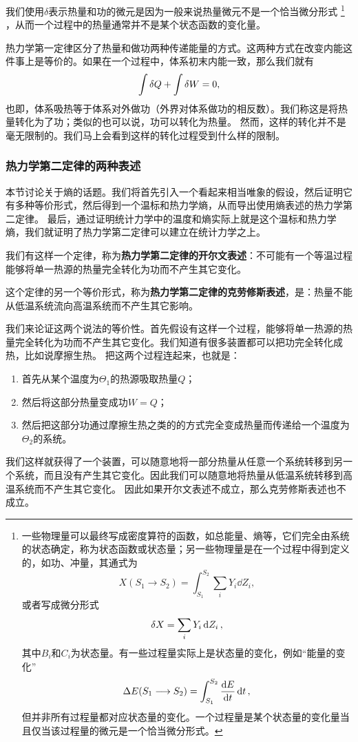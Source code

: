 \documentclass[hyperref, UTF8, a4paper]{ctexart}
\begin{document}
我们使用$\delta$表示热量和功的微元是因为一般来说热量微元不是一个恰当微分形式%
\footnote{一些物理量可以最终写成密度算符的函数，如总能量、熵等，它们完全由系统的状态确定，称为状态函数或状态量；另一些物理量是在一个过程中得到定义的，如功、冲量，其通式为
\[
    X(S_1 \longrightarrow S_2) = \int_{S_1}^{S_2} \sum_i Y_i \dd{Z_i},
\]
或者写成微分形式
\[
    \var{X} = \sum_i Y_i \dd{Z_i},
\]
其中$B_i$和$C_i$为状态量。有一些过程量实际上是状态量的变化，例如“能量的变化”
\[
    \Delta E (S_1 \longrightarrow S_2) = \int_{S_1}^{S_2} \dv{E}{t} \dd{t},
\]
但并非所有过程量都对应状态量的变化。一个过程量是某个状态量的变化量当且仅当该过程量的微元是一个恰当微分形式。}%
，从而一个过程中的热量通常并不是某个状态函数的变化量。

热力学第一定律区分了热量和做功两种传递能量的方式。这两种方式在改变内能这件事上是等价的。如果在一个过程中，体系初末内能一致，那么我们就有
\[
    \int \var{Q} + \int \var{W} = 0,
\]
也即，体系吸热等于体系对外做功（外界对体系做功的相反数）。我们称这是将热量转化为了功；类似的也可以说，功可以转化为热量。
然而，这样的转化并不是毫无限制的。我们马上会看到这样的转化过程受到什么样的限制。

\subsubsection{热力学第二定律的两种表述}

本节讨论关于熵的话题。我们将首先引入一个看起来相当唯象的假设，然后证明它有多种等价形式，然后得到一个温标和热力学熵，从而导出使用熵表述的热力学第二定律。
最后，通过证明统计力学中的温度和熵实际上就是这个温标和热力学熵，我们就证明了热力学第二定律可以建立在统计力学之上。

我们有这样一个定律，称为\textbf{热力学第二定律的开尔文表述}：不可能有一个等温过程能够将单一热源的热量完全转化为功而不产生其它变化。

这个定律的另一个等价形式，称为\textbf{热力学第二定律的克劳修斯表述}，是：热量不能从低温系统流向高温系统而不产生其它影响。

我们来论证这两个说法的等价性。首先假设有这样一个过程，能够将单一热源的热量完全转化为功而不产生其它变化。我们知道有很多装置都可以把功完全转化成热，比如说摩擦生热。
把这两个过程连起来，也就是：
\begin{enumerate}
    \item 首先从某个温度为$\Theta_1$的热源吸取热量$Q$；
    \item 然后将这部分热量变成功$W=Q$；
    \item 然后把这部分功通过摩擦生热之类的的方式完全变成热量而传递给一个温度为$\Theta_2$的系统。
\end{enumerate}
我们这样就获得了一个装置，可以随意地将一部分热量从任意一个系统转移到另一个系统，而且没有产生其它变化。因此我们可以随意地将热量从低温系统转移到高温系统而不产生其它变化。
因此如果开尔文表述不成立，那么克劳修斯表述也不成立。
\end{document}
